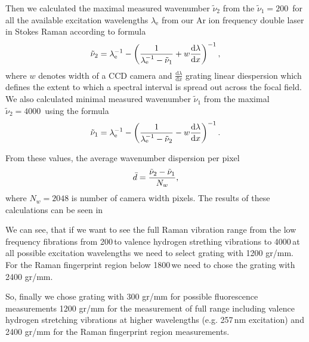 Then we calculated the maximal measured wavenumber $\tilde{\nu}_2$ from the
$\tilde{\nu}_1 = 200$\,\icm{} for all the available excitation wavelengths
$\lambda_\text{e}$ from our Ar ion frequency double laser in Stokes Raman
according to formula
\begin{equation}
	\tilde{\nu}_2 = \lambda_\text{e}^{-1}
		- \left(\frac{1}{\lambda_\text{e}^{-1} - \tilde{\nu}_1}
			+ w\frac{\text{d}\lambda}{\text{d}x}\right)^{-1},
	\label{\eqnlabel{spectrograph_selection:spectral_range_max_est}}
\end{equation}
where $w$ denotes width of a CCD camera and $\frac{\text{d}\lambda}{\text{d}x}$
grating linear diespersion which defines the extent to which a spectral
interval is spread out across the focal field. We also calculated minimal
measured wavenumber $\tilde{\nu}_1$ from the maximal
$\tilde{\nu}_2 = 4000$\,\icm{} using the formula
\begin{equation}
	\tilde{\nu}_1 = \lambda_\text{e}^{-1}
		- \left(\frac{1}{\lambda_\text{e}^{-1} - \tilde{\nu}_2}
			- w\frac{\text{d}\lambda}{\text{d}x}\right)^{-1}.
	\label{\eqnlabel{spectrograph_selection:spectral_range_min_est}}
\end{equation}

From these values, the average wavenumber dispersion per pixel
\begin{equation}
	\bar{d} = \frac{\tilde{\nu}_2 - \tilde{\nu}_1}{N_w},
	\label{\eqnlabel{spectrograph_selection:dispersion_est}}
\end{equation}
where $N_w = 2048$ is number of camera width pixels. The results of these
calculations can be seen in 

\begin{table}
	\centering
	
	\caption{Spectrograph dispersion estimation. Gratins are denoted by number
		of grooves per mm, $\tilde{\nu}_1$ and $\tilde{\nu}_2$ are lowest and
		highest detected frequencies in \icm calculated according to
		\cref{%
			\eqnlabel{spectrograph_selection:spectral_range_max_est},%
			\eqnlabel{spectrograph_selection:spectral_range_min_est}%
		},
		respectively. The $\bar{d}$ denotes average dispersion in \icm/px
		calculated from .}
	\label{\tablabel{spectrograph_selection:dispersion_est}}
\end{table}

We can see, that if we want to see the full Raman vibration range from the
low frequency fibrations from 200\,\icm to valence hydrogen strething
vibrations to 4000\,\icm at all possible excitation wavelengths we need to
select grating with 1200 gr/mm. For the Raman fingerprint region below
1800\,\icm we need to chose the grating with 2400 gr/mm.

So, finally we chose grating with 300 gr/mm for possible fluorescence
measurements 1200 gr/mm for the measurement of full range including valence
hydrogen stretching vibrations at higher wavelengths (e.g. 257\,nm excitation)
and 2400 gr/mm for the Raman fingerprint region measurements.
